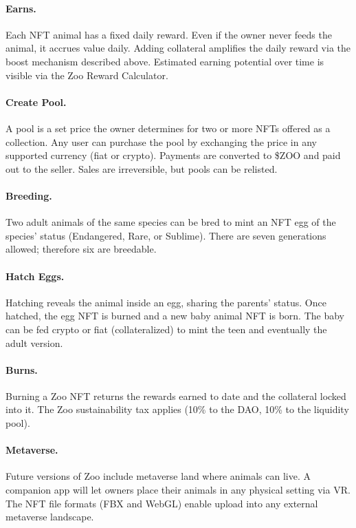 \paragraph{Earns.} Each NFT animal has a fixed daily reward. Even if the owner never feeds the animal, it accrues value daily. Adding collateral amplifies the daily reward via the boost mechanism described above. Estimated earning potential over time is visible via the Zoo Reward Calculator.

\paragraph{Create Pool.} A pool is a set price the owner determines for two or more NFTs offered as a collection. Any user can purchase the pool by exchanging the price in any supported currency (fiat or crypto). Payments are converted to \$ZOO and paid out to the seller. Sales are irreversible, but pools can be relisted.

\paragraph{Breeding.} Two adult animals of the same species can be bred to mint an NFT egg of the species' status (Endangered, Rare, or Sublime). There are seven generations allowed; therefore six are breedable.

\paragraph{Hatch Eggs.} Hatching reveals the animal inside an egg, sharing the parents' status. Once hatched, the egg NFT is burned and a new baby animal NFT is born. The baby can be fed crypto or fiat (collateralized) to mint the teen and eventually the adult version.

\paragraph{Burns.} Burning a Zoo NFT returns the rewards earned to date and the collateral locked into it. The Zoo sustainability tax applies (10\% to the DAO, 10\% to the liquidity pool).

\paragraph{Metaverse.} Future versions of Zoo include metaverse land where animals can live. A companion app will let owners place their animals in any physical setting via VR. The NFT file formats (FBX and WebGL) enable upload into any external metaverse landscape.

